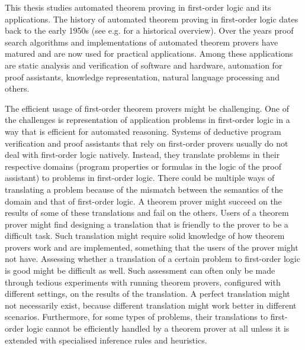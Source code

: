 
This thesis studies automated theorem proving in first-order logic and its applications. The history of automated theorem proving in first-order logic dates back to the early 1950s (see e.g. \cite{bundy1999survey,davis2001early,harrison2007short} for a historical overview). Over the years proof search algorithms and implementations of automated theorem provers have matured and are now used for practical applications. Among these applications are static analysis and verification of software and hardware, automation for proof assistants, knowledge representation, natural language processing and others.

The efficient usage of first-order theorem provers might be challenging. One of the challenges is representation of application problems in first-order logic in a way that is efficient for automated reasoning. Systems of deductive program verification and proof assistants that rely on first-order provers usually do not deal with first-order logic natively. Instead, they translate problems in their respective domains (program properties or formulas in the logic of the proof assistant) to problems in first-order logic. There could be multiple ways of translating a problem because of the mismatch between the semantics of the domain and that of first-order logic. A theorem prover might succeed on the results of some of these translations and fail on the others. Users of a theorem prover might find designing a translation that is friendly to the prover to be a difficult task. Such translation might require solid knowledge of how theorem provers work and are implemented, something that the users of the prover might not have. Assessing whether a translation of a certain problem to first-order logic is good might be difficult as well. Such assessment can often only be made through tedious experiments with running theorem provers, configured with different settings, on the results of the translation. A perfect translation might not necessarily exist, because different translation might work better in different scenarios. Furthermore, for some types of problems, their translations to first-order logic cannot be efficiently handled by a theorem prover at all unless it is extended with specialised inference rules and heuristics.

